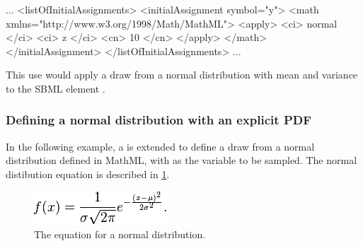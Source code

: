 \documentclass[draftspec]{sbmlpkgspec}
\begin{document}
\begin{example}
...
  <listOfInitialAssignments>
    <initialAssignment symbol="y">
      <math xmlns="http://www.w3.org/1998/Math/MathML">
        <apply>
          <ci> normal </ci>
          <ci> z </ci>
          <cn> 10 </cn>
        </apply>
      </math>
    </initialAssignment>
  </listOfInitialAssignments>
...
\end{example}

This use would apply a draw from a normal distribution with mean  and variance  to the SBML element .

\subsubsection{Defining a normal distribution with an explicit PDF}
In the following example, a \FunctionDefinition is extended to define a draw from a normal distribution defined in MathML, with  as the variable to be sampled.  The normal distibution equation is described in \ref{fig:normalequation}.

\begin{figure}[htb]
\includegraphics[width=0.2\linewidth]{gaussian_distribution_function.png}
\caption{The equation for a normal distribution.}
\label{fig:normalequation}
\end{figure}
\end{document}
